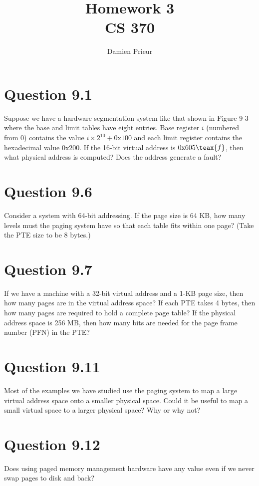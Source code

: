 \documentclass{article}
\author{Damien Prieur}
\title{Homework 3 \\ CS 370}
\date{}
\begin{document}
\maketitle

\section*{Question 9.1}
Suppose we have a hardware segmentation system like that shown in Figure 9-3 where the base and limit tables have eight entries.
Base register $i$ (numbered from 0) contains the value $i\times 2^{10} + 0\text{x}100$ and each limit register contains the hexadecimal value $0\text{x}200$.
If the 16-bit virtual address is $0\text{x}605\teax{f}$, then what physical address is computed?
Does the address generate a fault?

\section*{Question 9.6}
Consider a system with 64-bit addressing. If the page size is 64 KB, how many levels must the paging system have so that each table fits within one page? (Take the PTE size to be 8 bytes.)

\section*{Question 9.7}
If we have a machine with a 32-bit virtual address and a 1-KB page size, then how many pages are in the virtual address space?
If each PTE takes 4 bytes, then how many pages are required to hold a complete page table?
If the physical address space is 256 MB, then how many bits are needed for the page frame number (PFN) in the PTE?

\section*{Question 9.11}
Most of the examples we have studied use the paging system to map a large virtual address space onto a smaller physical space.
Could it be useful to map a small virtual space to a larger physical space?
Why or why not?

\section*{Question 9.12}
Does using paged memory management hardware have any value even if we never swap pages to disk and back?
\end{document}
